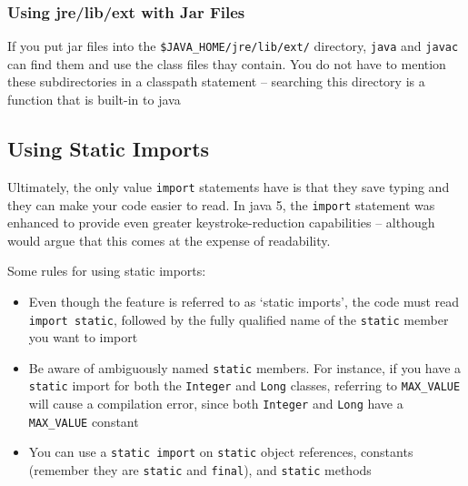 \subsubsection{Using jre/lib/ext with Jar Files}
If you put jar files into the \verb#$JAVA_HOME/jre/lib/ext/# directory, 
\verb#java# and \verb#javac# can find them and use the class files thay 
contain. You do not have to mention these subdirectories in a classpath 
statement -- searching this directory is a function that is built-in to java

\subsection{Using Static Imports}
Ultimately, the only value \verb#import# statements have is that they save 
typing and they can make your code easier to read. In java 5, the \verb#import# 
statement was enhanced to provide even greater keystroke-reduction capabilities 
-- although would argue that this comes at the expense of readability.

Some rules for using static imports:
\begin{itemize}
    \item Even though the feature is referred to as `static imports', the code 
    must read \verb#import static#, followed by the fully qualified name of the 
    \verb#static# member you want to import
    \item Be aware of ambiguously named \verb#static# members. For instance, if 
    you have a \verb#static# import for both the \verb#Integer# and \verb#Long# 
    classes, referring to \verb#MAX_VALUE# will cause a compilation error, 
    since both \verb#Integer# and \verb#Long# have a \verb#MAX_VALUE# constant
    \item You can use a \verb#static import# on \verb#static# object 
    references, constants (remember they are \verb#static# and \verb#final#), 
    and \verb#static# methods
\end{itemize}
